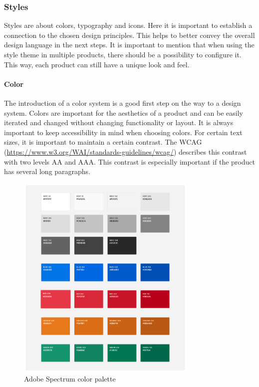 \subsubsection{Styles}
Styles are about colors, typography and icons. Here it is important to establish a connection to the chosen design principles. This helps to better convey the overall design language in the next steps. 
It is important to mention that when using the style theme in multiple products, there should be a possibility to configure it. This way, each product can still have a unique look and feel. \cite{vesselov_building_2019}
\paragraph{Color}
The introduction of a color system is a good first step on the way to a design system. Colors are important for the aesthetics of a product and can be easily iterated and changed without changing functionality or layout. It is always important to keep accessibility in mind when choosing colors. For certain text sizes, it is important to maintain a certain contrast. The WCAG (\url{https://www.w3.org/WAI/standards-guidelines/wcag/}) describes this contrast with two levels AA and AAA. This contrast is especially important if the product has several long paragraphs.  \\
\begin{figure}[hbtp]
	\centerline{\includegraphics[height=10cm]{images/adobe_spectrum_color_palette.png}}
	\caption{Adobe Spectrum color palette \cite{spectrum_adobe_spectrum_nodate}}
	\label{adobe_spectrum_colors}
\end{figure}

